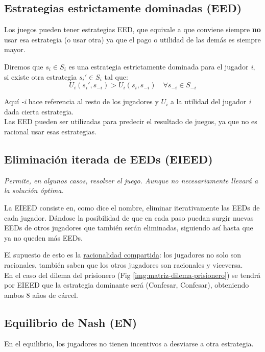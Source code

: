 \subsection{Estrategias estrictamente dominadas (EED)}

Los juegos pueden tener estrategias EED, que equivale a que conviene siempre \textbf{no} usar esa estrategia (o usar otra) ya que el pago o utilidad de las demás es siempre mayor.

Diremos que $s_i \in S_i$ es una estrategia estrictamente dominada para el jugador \textit{i}, si existe otra estrategia $s_i' \in S_i$ tal que:
\[U_i(s_i', s_{-i}) > U_i(s_i, s_{-i}) \quad \forall s_{-i} \in S_{-i} \]

Aquí \textit{-i} hace referencia al resto de los jugadores y $U_i$ a la utilidad del jugador \textit{i} dada cierta estrategia.
\\
Las EED pueden ser utilizadas para predecir el resultado de juegos, ya que no es racional usar esas estrategias.

\subsection{Eliminación iterada de EEDs (EIEED)}

\textit{Permite, en algunos casos, resolver el juego. Aunque no necesariamente llevará a la solución óptima.}


La EIEED consiste en, como dice el nombre, eliminar iterativamente las EEDs de cada jugador. Dándose la posibilidad de que en cada paso puedan surgir nuevas EEDs de otros jugadores que también serán eliminadas, siguiendo así hasta que ya no queden más EEDs.

El supuesto de esto es la \underline{racionalidad compartida}: los jugadores no solo son racionales, también saben que los otros jugadores son racionales y viceversa. 
\\[0.2em]

En el caso del dilema del prisionero (Fig \ref{img:matriz-dilema-prisionero}) se tendrá por EIEED que la estrategia dominante será (Confesar, Confesar), obteniendo ambos 8 años de cárcel. 

\subsection{Equilibrio de Nash (EN)}

En el equilibrio, los jugadores no tienen incentivos a desviarse a otra estrategia. 

